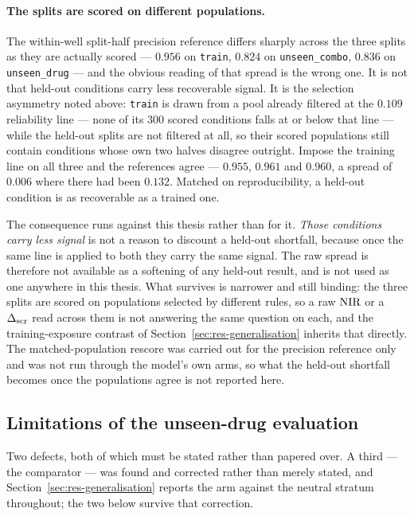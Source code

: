 \paragraph{The splits are scored on different populations.} The within-well split-half precision
reference differs sharply across the three splits as they are actually scored --- $0.956$ on
\texttt{train}, $0.824$ on \texttt{unseen\_combo}, $0.836$ on \texttt{unseen\_drug} --- and the
obvious reading of that spread is the wrong one. It is not that held-out conditions carry less
recoverable signal. It is the selection asymmetry noted above: \texttt{train} is drawn from a pool already filtered at
the $0.109$ reliability line --- none of its $300$ scored conditions falls at or below that line ---
while the held-out splits are not filtered at all, so their scored populations still contain
conditions whose own two halves disagree outright. Impose the training line on all three and the references agree --- $0.955$,
$0.961$ and $0.960$, a spread of $0.006$ where there had been $0.132$. Matched on reproducibility,
a held-out condition is as recoverable as a trained one.

The consequence runs against this thesis rather than for it. \emph{Those conditions carry less
signal} is not a reason to discount a held-out shortfall, because once the same line is applied to
both they carry the same signal. The raw spread is therefore not available as a softening of any
held-out result, and is not used as one anywhere in this thesis. What survives is narrower and still binding: the three splits are
scored on populations selected by different rules, so a raw $\textrm{NIR}$ or a $\Delta_{\textrm{scr}}$ read across them is
not answering the same question on each, and the training-exposure contrast of
Section~\ref{sec:res-generalisation} inherits that directly. The matched-population rescore was
carried out for the precision reference only and was not run through the model's own arms, so what
the held-out shortfall becomes once the populations agree is not reported here.

\subsection{Limitations of the unseen-drug evaluation}

Two defects, both of which must be stated rather than papered over. A third --- the comparator ---
was found and corrected rather than merely stated, and Section~\ref{sec:res-generalisation} reports
the arm against the neutral stratum throughout; the two below survive that correction.

